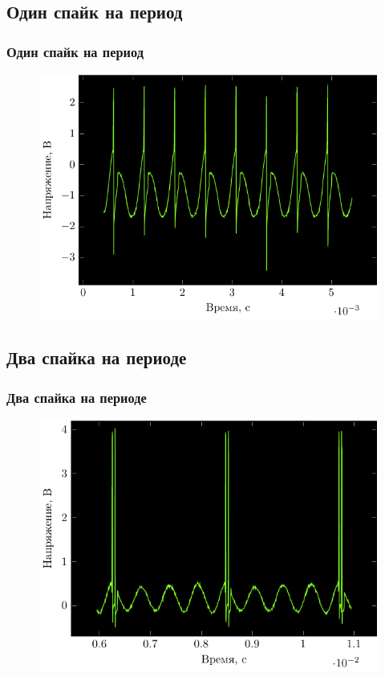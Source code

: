 \subsection{Один спайк на период}
\begin{frame}%
	\frametitle{Один спайк на период}
	\begin{figure}[h]
		\hspace{-2em}
		\includegraphics[]{img/onespike}
	\end{figure}
\end{frame}
\subsection{Два спайка на периоде}
\begin{frame}%
	\frametitle{Два спайка на периоде}
	\begin{figure}[h]
		\hspace{-2em}
		\includegraphics[]{img/twospike}
	\end{figure}
\end{frame}
